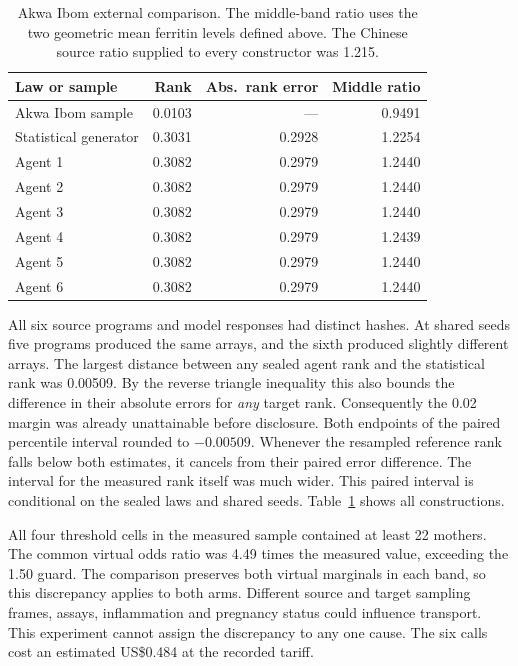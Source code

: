 \begin{table}[t]
\caption{Akwa Ibom external comparison. The middle-band ratio uses the two geometric mean ferritin levels defined above. The Chinese source ratio supplied to every constructor was 1.215.}
\label{tab:akwa}
\centering\small
\begin{tabular}{@{}lrrr@{}}
\toprule
Law or sample & Rank & Abs.\ rank error & Middle ratio\\
\midrule
Akwa Ibom sample & 0.0103 & --- & 0.9491\\
Statistical generator & 0.3031 & 0.2928 & 1.2254\\
Agent 1 & 0.3082 & 0.2979 & 1.2440\\
Agent 2 & 0.3082 & 0.2979 & 1.2440\\
Agent 3 & 0.3082 & 0.2979 & 1.2440\\
Agent 4 & 0.3082 & 0.2979 & 1.2439\\
Agent 5 & 0.3082 & 0.2979 & 1.2440\\
Agent 6 & 0.3082 & 0.2979 & 1.2440\\
\bottomrule
\end{tabular}
\end{table}

All six source programs and model responses had distinct hashes. At shared seeds five programs produced the same arrays, and the sixth produced slightly different arrays. The largest distance between any sealed agent rank and the statistical rank was 0.00509. By the reverse triangle inequality this also bounds the difference in their absolute errors for \emph{any} target rank. Consequently the 0.02 margin was already unattainable before disclosure. Both endpoints of the paired percentile interval rounded to $-0.00509$. Whenever the resampled reference rank falls below both estimates, it cancels from their paired error difference. The interval for the measured rank itself was much wider. This paired interval is conditional on the sealed laws and shared seeds. Table~\ref{tab:akwa} shows all constructions.

All four threshold cells in the measured sample contained at least 22 mothers. The common virtual odds ratio was 4.49 times the measured value, exceeding the 1.50 guard. The comparison preserves both virtual marginals in each band, so this discrepancy applies to both arms. Different source and target sampling frames, assays, inflammation and pregnancy status could influence transport. This experiment cannot assign the discrepancy to any one cause. The six calls cost an estimated US\$0.484 at the recorded tariff.

